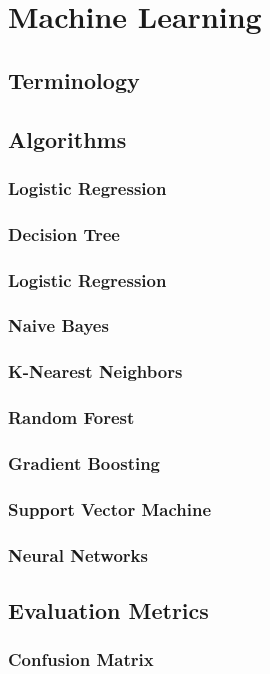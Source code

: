 \chapter{Machine Learning}
\label{chap:three}
\section{Terminology}
\section{Algorithms}
\subsection{Logistic Regression}
\subsection{Decision Tree}
\subsection{Logistic Regression}
\subsection{Naive Bayes}
\subsection{K-Nearest Neighbors}
\subsection{Random Forest}
\subsection{Gradient Boosting}
\subsection{Support Vector Machine}
\subsection{Neural Networks}
\section{Evaluation Metrics}
\subsection{Confusion Matrix}


